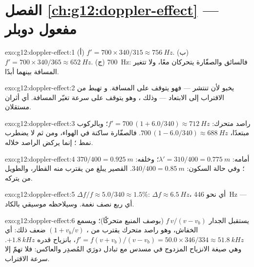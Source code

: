 \section*{الفصل \ref{ch:g12:doppler-effect} --- مفعول دوبلر}

\begin{solution}{exo:g12:doppler-effect:1}
(أ) $f' = 700 \times 340/315 \approx \qty{756}{Hz}$.
(ب) $f' = 700 \times 340/365 \approx \qty{652}{Hz}$.
(ج) \qty{700}{Hz}: فالسائق والصفّارة يتحركان معًا، ولا تتغير المسافة بينهما أبدًا.
\end{solution}

\begin{solution}{exo:g12:doppler-effect:2}
\emph{} يخبو لأن  تنتشر --- فهو يتوقف على المسافة.
و\emph{} تهبط من الاقتراب إلى الابتعاد --- وذلك ، وهو يتوقف
على سرعة تغيّر المسافة. أي أثران مستقلان.
\end{solution}

\begin{solution}{exo:g12:doppler-effect:3}
راصد متحرك: $f' = 700\,(1 + 6.0/340) \approx \qty{712}{Hz}$؛ وبالركوب مبتعدًا،
$700\,(1 - 6.0/340) \approx \qty{688}{Hz}$. فالصفّارة ساكنة في الهواء، ومن ثم لا يضطرب نمط
؛ إنما يركض الراصد خلاله.
\end{solution}

\begin{solution}{exo:g12:doppler-effect:4}
أمامه: $\lambda' = 310/400 = \qty{0.775}{m}$؛ وخلفه: $370/400 = \qty{0.925}{m}$؛ وفي حالة
السكون: $340/400 = \qty{0.85}{m}$.  القصير يبلغ من يقترب منه القطار،
والطويل من يتركه.
\end{solution}

\begin{solution}{exo:g12:doppler-effect:5}
$\Delta f/f \approx 5.0/340 \approx 1.5\%$: $\Delta f \approx \qty{6.5}{Hz}$، أي نحو
\qty{446}{Hz} --- أي ربع نصف نغمة. وسيلاحظه موسيقي بالكاد.
\end{solution}

\begin{solution}{exo:g12:doppler-effect:6}
يستقبل الجدار $f\,v/(v - v_b)$ (بوصف المنبع متحركًا)؛ ويسمع الخفاش، وهو راصد متحرك يقترب من
، $(1 + v_b/v)$ ضعف ذلك: أي $f' = f(v + v_b)/(v - v_b) = 50.0 \times
346/334 \approx \qty{51.8}{kHz}$، بانزياح قدره $+\qty{1.8}{kHz}$. وهي صيغة
الانزياح المزدوج في مسدس  مع تبادل دورَي المُصدِر والعاكس: فلا تهمّ إلا سرعة الاقتراب.
\end{solution}

